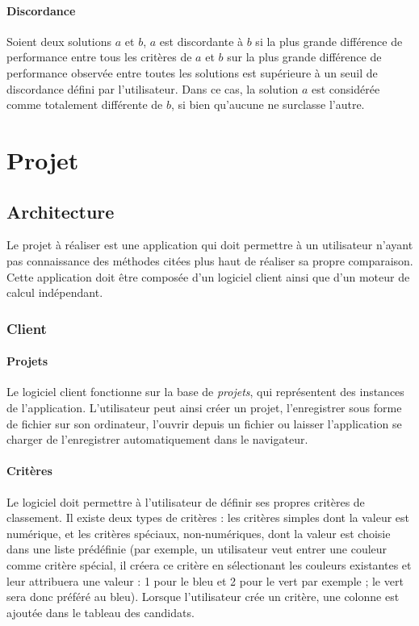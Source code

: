 \documentclass[a4paper]{article}
\begin{document}
\paragraph{Discordance}
Soient deux solutions \(a\) et \(b\), \(a\) est discordante à \(b\) si la plus grande différence de performance entre tous les critères de \(a\) et \(b\) sur la plus grande différence de performance observée entre toutes les solutions est supérieure à un seuil de discordance défini par l'utilisateur. Dans ce cas, la solution \(a\) est considérée comme totalement différente de \(b\), si bien qu'aucune ne surclasse l'autre.

\newpage

\section{Projet}

\subsection{Architecture}

Le projet à réaliser est une application qui doit permettre à un utilisateur n'ayant pas connaissance des méthodes citées plus haut de réaliser sa propre comparaison. Cette application doit être composée d'un logiciel client ainsi que d'un moteur de calcul indépendant.

\subsubsection{Client}

\paragraph{Projets} Le logiciel client fonctionne sur la base de \textit{projets}, qui représentent des instances de l'application. L'utilisateur peut ainsi créer un projet, l'enregistrer sous forme de fichier sur son ordinateur, l'ouvrir depuis un fichier ou laisser l'application se charger de l'enregistrer automatiquement dans le navigateur.

\paragraph{Critères} Le logiciel doit permettre à l'utilisateur de définir ses propres critères de classement. Il existe deux types de critères : les critères simples dont la valeur est numérique, et les critères spéciaux, non-numériques, dont la valeur est choisie dans une liste prédéfinie (par exemple, un utilisateur veut entrer une couleur comme critère spécial, il créera ce critère en sélectionant les couleurs existantes et leur attribuera une valeur : 1 pour le bleu et 2 pour le vert par exemple ; le vert sera donc préféré au bleu). Lorsque l'utilisateur crée un critère, une colonne est ajoutée dans le tableau des candidats. 
\end{document}
